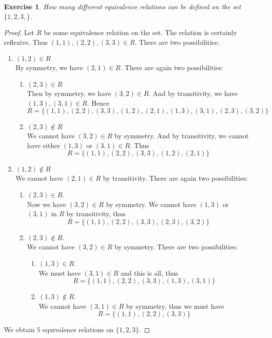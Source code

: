 \documentclass[a4paper, 11pt]{book}
\theoremstyle{plain}
\newtheorem{exercise}[theorem]{Exercise}
\theoremstyle{plain}
\begin{document}
\begin{exercise}
How many different equivalence relations can be defined on the set $\{1,2,3,\}$.
\end{exercise}
\begin{proof}
Let $R$ be some equivalence relation on the set. The relation is certainly reflexive. Thus $(1,1),(2,2),(3,3)\in R$. There are two possibilities:
\begin{enumerate}
\item $(1,2)\in R$\\
By symmetry, we have $(2,1)\in R$. There are again two possibilities:
\begin{enumerate}
\item $(2,3)\in R$\\
Then by symmetry, we have $(3,2)\in R$. And by transitivity, we have $(1,3),(3,1)\in R$. Hence
$$R = \{(1,1),(2,2),(3,3),(1,2),(2,1),(1,3),(3,1),(2,3),(3,2)\}$$
\item $(2,3)\notin R$\\
We cannot have $(3,2)\in R$ by symmetry. And by transitivity, we cannot have either $(1,3)$ or $(3,1)\in R$. Thus
$$R = \{(1,1),(2,2),(3,3),(1,2),(2,1)\}$$
\end{enumerate}
\item $(1,2)\notin R$\\
We cannot have $(2,1)\in R$ by transitivity. There are again two possibilities:
\begin{enumerate}
\item $(2,3)\in R$.\\
Now we have $(3,2)\in R$ by symmetry. We cannot have $(1,3)$ or $(3,1)$ in $R$ by transitivity, thus
$$R = \{(1,1),(2,2),(3,3),(2,3),(3,2)\}$$
\item $(2,3)\notin R$.\\
We cannot have $(3,2)\in R$ by symmetry. There are two possibilities:
\begin{enumerate}
\item $(1,3)\in R$.\\
We must have $(3,1)\in R$ and this is all, thus
$$R = \{(1,1),(2,2),(3,3),(1,3),(3,1)\}$$
\item $(1,3)\notin R$.\\
We cannot have $(3,1)\in R$ by symmetry, thus we must have
$$R= \{(1,1),(2,2),(3,3)\}$$
\end{enumerate}
\end{enumerate}
\end{enumerate}
We obtain $5$ equivalence relations on $\{1,2,3\}$.
\end{proof}
\end{document}
